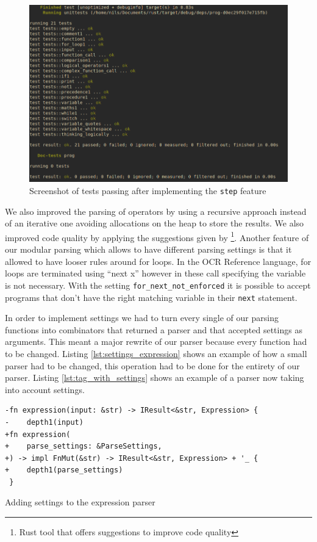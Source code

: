 \documentclass{article}
\begin{document}
\begin{figure}
	\includegraphics[width=\textwidth]{thinking_logically_passing}
	\caption{Screenshot of tests passing after implementing the \texttt{step}
	feature}
	\label{fig:thinking_logically_passing}
\end{figure}

We also improved the parsing of operators by using a recursive approach instead
of an iterative one avoiding allocations on the heap to store the results. We
also improved code quality by applying the suggestions given by
\footnote{Rust tool that offers suggestions to improve code
quality}. Another feature of our modular parsing which allows to have different
parsing settings is that it allowed to have looser rules around for loops. In
the OCR Reference language, for loops are terminated using ``next x'' however
in these call specifying the variable is not necessary. With the setting
\texttt{for\_next\_not\_enforced} it is possible to accept programs that don't
have the right matching variable in their \texttt{next} statement.

In order to implement settings we had to turn every single of our parsing
functions into combinators that returned a parser and that accepted settings as
arguments. This meant a major rewrite of our parser because every function had
to be changed. Listing \ref{lst:settings_expression} shows an example of how a
small parser had to be changed, this operation had to be done for the entirety
of our parser. Listing \ref{lst:tag_with_settings} shows an example of a parser
now taking into account settings.

\begin{listing}
	\begin{verbatim}
-fn expression(input: &str) -> IResult<&str, Expression> {
-    depth1(input)
+fn expression(
+    parse_settings: &ParseSettings,
+) -> impl FnMut(&str) -> IResult<&str, Expression> + '_ {
+    depth1(parse_settings)
 }
	\end{verbatim}
	\caption{Adding settings to the expression parser}
	\label{lst:settings_expression}
\end{listing}
\end{document}
